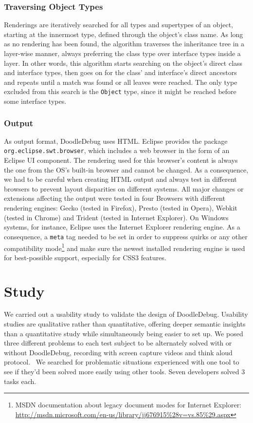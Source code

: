 \documentclass[english]{scrartcl}
\newcommand{\DD}{Dood\-le\-De\-bug\xspace}
\begin{document}
\subsubsection{Traversing Object Types}
Renderings are iteratively searched for all types and supertypes of an object, starting at the innermost type, defined through the object's class name.
As long as no rendering has been found, the algorithm traverses the inheritance tree in a layer-wise manner, always preferring the class type over interface types inside a layer.
In other words, this algorithm starts searching on the object's direct class and interface types, then goes on for the class' and interface's direct ancestors and repeats until a match was found or all leaves were reached.
The only type excluded from this search is the \texttt{Object} type, since it might be reached before some interface types.

\subsubsection{Output}
As output format, \DD uses HTML.
Eclipse provides the package \texttt{org.ec\-lipse.swt.brow\-ser}, which includes a web browser in the form of an Eclipse UI component.
The rendering used for this browser's content is always the one from the OS's built-in browser and cannot be changed.
As a consequence, we had to be careful when creating HTML output and always test in different browsers to prevent layout disparities on different systems.
All major changes or extensions affecting the output were tested in four Browsers with different rendering engines: Gecko (tested in Firefox), Presto (tested in Opera), Webkit (tested in Chrome) and Trident (tested in Internet Explorer).
On Windows systems, for instance, Eclipse uses the Internet Explorer rendering engine.
As a consequence, a \texttt{meta} tag needed to be set in order to suppress quirks or any other compatibility mode\footnote{MSDN documentation about legacy document modes for Internet Explorer: \url{http://msdn.microsoft.com/en-us/library/jj676915\%28v=vs.85\%29.aspx}} and make sure the newest installed rendering engine is used for best-possible support, especially for CSS3 features.


\section{Study}

We carried out a usability study \cite{Krug00a} to validate the design of \DD.
Usability studies are qualitative rather than quantitative, offering deeper semantic insights~\cite[pp. 13--15]{Lang09b} than a quantitative study while simultaneously being easier to set up.
We posed three different problems to each test subject to be alternately solved with or without \DD, recording with screen capture videos and think aloud protocol.~\cite{Krug00a,Lang09b}
We searched for problematic situations experienced with one tool to see if they'd been solved more easily using other tools.
Seven developers solved 3 tasks each.
\end{document}
